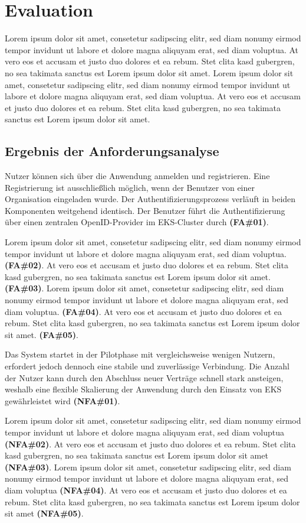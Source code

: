 \chapter{Evaluation} 
Lorem ipsum dolor sit amet, consetetur sadipscing
elitr, sed diam nonumy eirmod tempor invidunt ut labore
et dolore magna aliquyam erat, sed diam voluptua. At vero eos et
accusam et justo duo dolores et ea rebum. Stet clita kasd gubergren, 
no sea takimata sanctus est Lorem ipsum dolor sit amet. Lorem ipsum dolor 
sit amet, consetetur sadipscing elitr, sed diam nonumy eirmod tempor 
invidunt ut labore et dolore magna aliquyam erat, sed diam voluptua. 
At vero eos et accusam et justo duo dolores et ea rebum. Stet clita kasd 
gubergren, no sea takimata sanctus est Lorem ipsum dolor sit amet.

\section{Ergebnis der Anforderungsanalyse}


Nutzer können sich über die Anwendung anmelden und registrieren. Eine Registrierung ist ausschließlich möglich, wenn der Benutzer von einer Organisation eingeladen wurde. Der Authentifizierungsprozess verläuft in beiden Komponenten weitgehend identisch. Der Benutzer führt die Authentifizierung über einen zentralen OpenID-Provider im EKS-Cluster durch \textbf{(FA\#01)}.

Lorem ipsum dolor sit amet, consetetur sadipscing elitr, sed diam nonumy eirmod tempor invidunt ut labore et dolore magna aliquyam erat, sed diam voluptua. \textbf{(FA\#02)}.
At vero eos et accusam et justo duo dolores et ea rebum. Stet clita kasd gubergren, no sea takimata sanctus est Lorem ipsum dolor sit amet. \textbf{(FA\#03)}.
Lorem ipsum dolor sit amet, consetetur sadipscing elitr, sed diam nonumy eirmod tempor invidunt ut labore et dolore magna aliquyam erat, sed diam voluptua. \textbf{(FA\#04)}.
At vero eos et accusam et justo duo dolores et ea rebum. Stet clita kasd gubergren, no sea takimata sanctus est Lorem ipsum dolor sit amet. \textbf{(FA\#05)}.


Das System startet in der Pilotphase mit vergleichsweise wenigen Nutzern, erfordert jedoch dennoch eine stabile und zuverlässige Verbindung. Die Anzahl der Nutzer kann durch den Abschluss neuer Verträge schnell stark ansteigen, weshalb eine flexible Skalierung der Anwendung durch den Einsatz von EKS gewährleistet wird \textbf{(NFA\#01)}.

Lorem ipsum dolor sit amet, consetetur sadipscing elitr, sed diam nonumy eirmod tempor invidunt ut labore et dolore magna aliquyam erat, sed diam voluptua \textbf{(NFA\#02)}.
At vero eos et accusam et justo duo dolores et ea rebum. Stet clita kasd gubergren, no sea takimata sanctus est Lorem ipsum dolor sit amet \textbf{(NFA\#03)}.
Lorem ipsum dolor sit amet, consetetur sadipscing elitr, sed diam nonumy eirmod tempor invidunt ut labore et dolore magna aliquyam erat, sed diam voluptua \textbf{(NFA\#04)}.
At vero eos et accusam et justo duo dolores et ea rebum. Stet clita kasd gubergren, no sea takimata sanctus est Lorem ipsum dolor sit amet \textbf{(NFA\#05)}.


